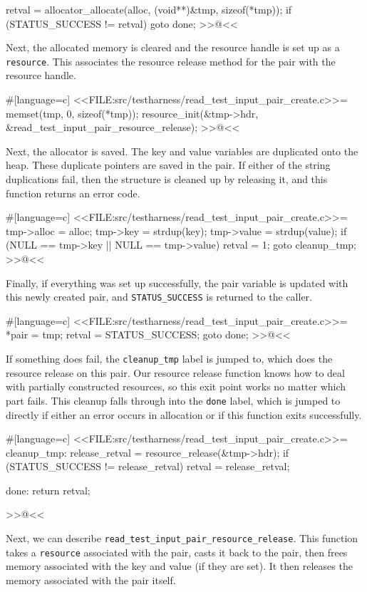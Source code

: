 {{    retval = allocator_allocate(alloc, (void**)&tmp, sizeof(*tmp));
    if (STATUS_SUCCESS != retval)
    {
        goto done;
    }
>>@<<

Next, the allocated memory is cleared and the resource handle is set up as a
\verb/resource/.  This associates the resource release method for the pair with
the resource handle.

#[language=c]
<<FILE:src/testharness/read_test_input_pair_create.c>>=
    memset(tmp, 0, sizeof(*tmp));
    resource_init(&tmp->hdr, &read_test_input_pair_resource_release);
>>@<<

Next, the allocator is saved.  The key and value variables are duplicated onto
the heap. These duplicate pointers are saved in the pair. If either of the
string duplications fail, then the structure is cleaned up by releasing it, and
this function returns an error code.

#[language=c]
<<FILE:src/testharness/read_test_input_pair_create.c>>=
    tmp->alloc = alloc;
    tmp->key = strdup(key);
    tmp->value = strdup(value);
    if (NULL == tmp->key || NULL == tmp->value)
    {
        retval = 1;
        goto cleanup_tmp;
    }
>>@<<

Finally, if everything was set up successfully, the pair variable is updated
with this newly created pair, and \verb/STATUS_SUCCESS/ is returned to the
caller.

#[language=c]
<<FILE:src/testharness/read_test_input_pair_create.c>>=
    *pair = tmp;
    retval = STATUS_SUCCESS;
    goto done;
>>@<<

If something does fail, the \verb/cleanup_tmp/ label is jumped to, which does
the resource release on this pair. Our resource release function knows how to
deal with partially constructed resources, so this exit point works no matter
which part fails.  This cleanup falls through into the \verb/done/ label, which
is jumped to directly if either an error occurs in allocation or if this
function exits successfully.

#[language=c]
<<FILE:src/testharness/read_test_input_pair_create.c>>=
cleanup_tmp:
    release_retval = resource_release(&tmp->hdr);
    if (STATUS_SUCCESS != release_retval)
    {
        retval = release_retval;
    }

done:
    return retval;
}
>>@<<

Next, we can describe \verb/read_test_input_pair_resource_release/. This
function takes a \verb/resource/ associated with the pair, casts it back to the
pair, then frees memory associated with the key and value (if they are set). It
then releases the memory associated with the pair itself.

}
